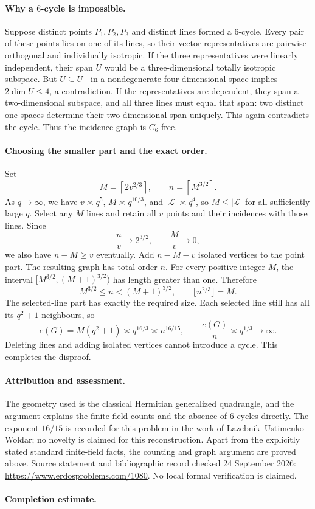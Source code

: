 \paragraph{Why a \(6\)-cycle is impossible.}
Suppose distinct points \(P_1,P_2,P_3\) and distinct lines formed a \(6\)-cycle. Every pair of these points lies on one of its lines, so their vector representatives are pairwise orthogonal and individually isotropic. If the three representatives were linearly independent, their span \(U\) would be a three-dimensional totally isotropic subspace. But \(U\subseteq U^\perp\) in a nondegenerate four-dimensional space implies
\(2\dim U\leq4\), a contradiction. If the representatives are dependent, they span a two-dimensional subspace, and all three lines must equal that span: two distinct one-spaces determine their two-dimensional span uniquely. This again contradicts the cycle. Thus the incidence graph is \(C_6\)-free.

\paragraph{Choosing the smaller part and the exact order.}
Set
\[
 M=\left\lceil2v^{2/3}\right\rceil,\qquad
 n=\left\lceil M^{3/2}\right\rceil.
\]
As \(q\to\infty\), we have \(v\asymp q^5\), \(M\asymp q^{10/3}\), and \(|\mathcal L|\asymp q^4\), so \(M\leq|\mathcal L|\) for all sufficiently large \(q\). Select any \(M\) lines and retain all \(v\) points and their incidences with those lines. Since
\[
 \frac{n}{v}\longrightarrow2^{3/2},\qquad
 \frac{M}{v}\longrightarrow0,
\]
we also have \(n-M\geq v\) eventually. Add \(n-M-v\) isolated vertices to the point part. The resulting graph has total order \(n\).
For every positive integer \(M\), the interval
\([M^{3/2},(M+1)^{3/2})\) has length greater than one. Therefore
\[
 M^{3/2}\leq n<(M+1)^{3/2},
 \qquad \lfloor n^{2/3}\rfloor=M.
\]
The selected-line part has exactly the required size. Each selected line still has all its \(q^2+1\) neighbours, so
\[
 e(G)=M(q^2+1)\asymp q^{16/3}
 \asymp n^{16/15},\qquad
 \frac{e(G)}n\asymp q^{1/3}\longrightarrow\infty.
\]
Deleting lines and adding isolated vertices cannot introduce a cycle. This completes the disproof.

\paragraph{Attribution and assessment.}
The geometry used is the classical Hermitian generalized quadrangle, and the argument explains the finite-field counts and the absence of \(6\)-cycles directly. The exponent \(16/15\) is recorded for this problem in the work of Lazebnik--Ustimenko--Woldar; no novelty is claimed for this reconstruction. Apart from the explicitly stated standard finite-field facts, the counting and graph argument are proved above. Source statement and bibliographic record checked 24 September 2026: \url{https://www.erdosproblems.com/1080}. No local formal verification is claimed.

\paragraph{Completion estimate.}
